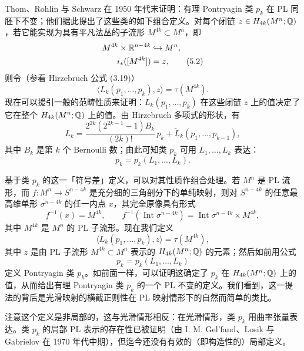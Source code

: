 Thom、Rohlin 与 Schwarz 在 1950 年代末证明：有理 Pontryagin 类 $p_{k}$ 在 PL 同胚下不变；他们据此提出了这些类的如下组合定义。对每个闭链 $z\in H_{4k}(M^{n};\mathbb{Q})$，若它能实现为具有平凡法丛的子流形 $M^{4k}\subset M^{n}$，即
\begin{align}
M^{4k}\times\mathbb{R}^{n-4k}&\hookrightarrow M^{n},\notag\\
i_{*}([M^{4k}])&=z, \tag{5.2}
\end{align}
则令（参看 Hirzebruch 公式 (3.19)）
\begin{equation}
\langle L_{k}(p_{1},\dots,p_{k}),z\rangle=\tau(M^{4k}). \tag{5.3}
\end{equation}
现在可以援引一般的范畴性质来证明：$L_{k}(p_{1},\dots,p_{k})$ 在这些闭链 $z$ 上的值决定了它在整个 $H_{4k}(M^{n};\mathbb{Q})$ 上的值。由 Hirzebruch 多项式的形状，有
\begin{equation}
L_{k}=\frac{2^{2k}(2^{2k-1}-1)B_{k}}{(2k)!}\,p_{k}+\tilde L_{k}(p_{1},\dots,p_{k-1}), \tag{5.4}
\end{equation}
其中 $B_{k}$ 是第 $k$ 个 Bernoulli 数；由此可知类 $p_{k}$ 可用 $L_{1},\dots,L_{k}$ 表达：
\begin{equation}
p_{k}=p_{k}(L_{1},\dots,L_{k}). \tag{5.5}
\end{equation}


基于类 $p_{k}$ 的这一「符号差」定义，可以对其性质作组合处理。若 $M^{n}$ 是 PL 流形，而 $f\colon M^{n}\to S^{n-4k}$ 是充分细的三角剖分下的单纯映射，则对 $S^{n-4k}$ 的任意最高维单形 $\sigma^{n-4k}$ 的任一内点 $x$，其完全原像具有形式
\[
f^{-1}(x)=M^{4k},\qquad f^{-1}(\operatorname{Int}\sigma^{n-4k})=\operatorname{Int}\sigma^{n-4k}\times M^{4k},
\]
其中 $M^{4k}$ 是 $M^{n}$ 的 PL 子流形。现在我们定义
\[
\langle L_{k}(p_{1},\dots,p_{k}),z\rangle=\tau(M^{4k}),
\]
其中 $z$ 是由 PL 子流形 $M^{4k}\subset M^{n}$ 表示的 $H_{4k}(M^{n};\mathbb{Q})$ 的元素；然后如前用公式
\[
p_{k}=p_{k}(L_{1},\dots,L_{k})
\]
定义 Pontryagin 类 $p_{k}$。如前面一样，可以证明这确定了 $p_{k}$ 在 $H_{4k}(M^{n};\mathbb{Q})$ 上的值，从而给出有理 Pontryagin 类 $p_{k}$ 的一个 PL 不变的定义。我们看到，这一提法的背后是光滑映射的横截正则性在 PL 映射情形下的自然而简单的类比。

注意这个定义是非局部的，这与光滑情形相反：在光滑情形，类 $p_{k}$ 用曲率张量表达。类 $p_{k}$ 的局部 PL 表示的存在性已被证明（由 I. M. Gel'fand、Losik 与 Gabrielov 在 1970 年代中期），但迄今还没有有效的（即构造性的）局部定义。


